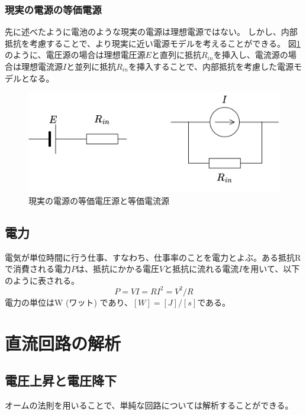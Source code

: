\documentclass{ltjsreport}
\begin{document}
\subsubsection{現実の電源の等価電源}
先に述べたように電池のような現実の電源は理想電源ではない。
しかし、内部抵抗を考慮することで、より現実に近い電源モデルを考えることができる。
図\ref{fig:real_battery}のように、電圧源の場合は理想電圧源$E$と直列に抵抗$R_{in}$を挿入し、電流源の場合は理想電流源$I$と並列に抵抗$R_{in}$を挿入することで、内部抵抗を考慮した電源モデルとなる。
\begin{figure}[tb]
  \centering
  \includegraphics[keepaspectratio, scale=0.07]
       {img/real_battery.drawio.png}
  \caption{現実の電源の等価電圧源と等価電流源}
  \label{fig:real_battery}
 \end{figure}




\subsection{電力}

電気が単位時間に行う仕事、すなわち、仕事率のことを電力とよぶ。ある抵抗Rで消費される電力$P$は、抵抗にかかる電圧$V$と抵抗に流れる電流$I$を用いて、以下のように表される。
\[
  P = VI = RI^2 = V^2/R
\]
電力の単位はW (ワット) であり、$[\si{W}] = [\si{J}]/[\si{s}]$である。



\section{直流回路の解析}

\subsection{電圧上昇と電圧降下}
オームの法則を用いることで、単純な回路については解析することができる。
\end{document}
